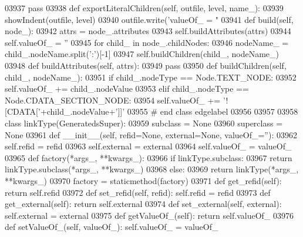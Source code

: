 \begin{DoxyCode}
{{{{{{{{{{{{{{{{{{{{{{{{{{{{{{{{{{{{{{{{{{{{{{{{{{{{{{{{{{{{{{{{{{{{{{{{{{{{{{{{{{{{{{{{{{{{{{{{{{{{{{{{{{{{{{{{{{{{{{{{{{{{{{{{{{{{{{{{{{{{{{{{{{{{{{{{{{{{{{{{{{{{{{{{{{{{{{{{{{{{{{{{{{{{{{{{{{{{{{{{{{{{{{{{{{{{{{{{{{{{{{{{{{{{{{{{{{{{{{{{{{{{{{{{{{{{{{{03937         \textcolor{keywordflow}{pass}
03938     \textcolor{keyword}{def }exportLiteralChildren(self, outfile, level, name\_):
03939         showIndent(outfile, level)
03940         outfile.write(\textcolor{stringliteral}{'valueOf\_ = "%
03941     \textcolor{keyword}{def }build(self, node\_):
03942         attrs = node\_.attributes
03943         self.buildAttributes(attrs)
03944         self.valueOf_ = \textcolor{stringliteral}{''}
03945         \textcolor{keywordflow}{for} child\_ \textcolor{keywordflow}{in} node\_.childNodes:
03946             nodeName\_ = child\_.nodeName.split(\textcolor{stringliteral}{':'})[-1]
03947             self.buildChildren(child\_, nodeName\_)
03948     \textcolor{keyword}{def }buildAttributes(self, attrs):
03949         \textcolor{keywordflow}{pass}
03950     \textcolor{keyword}{def }buildChildren(self, child\_, nodeName\_):
03951         \textcolor{keywordflow}{if} child\_.nodeType == Node.TEXT\_NODE:
03952             self.valueOf\_ += child\_.nodeValue
03953         \textcolor{keywordflow}{elif} child\_.nodeType == Node.CDATA\_SECTION\_NODE:
03954             self.valueOf\_ += \textcolor{stringliteral}{'![CDATA['}+child\_.nodeValue+\textcolor{stringliteral}{']]'}
03955 \textcolor{comment}{# end class edgelabel}
03956 
03957 
03958 \textcolor{keyword}{class }linkType(GeneratedsSuper):
03959     subclass = \textcolor{keywordtype}{None}
03960     superclass = \textcolor{keywordtype}{None}
03961     \textcolor{keyword}{def }__init__(self, refid=None, external=None, valueOf\_=''):
03962         self.refid = refid
03963         self.external = external
03964         self.valueOf_ = valueOf\_
03965     \textcolor{keyword}{def }factory(*args\_, **kwargs\_):
03966         \textcolor{keywordflow}{if} linkType.subclass:
03967             \textcolor{keywordflow}{return} linkType.subclass(*args\_, **kwargs\_)
03968         \textcolor{keywordflow}{else}:
03969             \textcolor{keywordflow}{return} linkType(*args\_, **kwargs\_)
03970     factory = staticmethod(factory)
03971     \textcolor{keyword}{def }get_refid(self): \textcolor{keywordflow}{return} self.refid
03972     \textcolor{keyword}{def }set_refid(self, refid): self.refid = refid
03973     \textcolor{keyword}{def }get_external(self): \textcolor{keywordflow}{return} self.external
03974     \textcolor{keyword}{def }set_external(self, external): self.external = external
03975     \textcolor{keyword}{def }getValueOf_(self): \textcolor{keywordflow}{return} self.valueOf\_
03976     \textcolor{keyword}{def }setValueOf_(self, valueOf\_): self.valueOf\_ = valueOf\_
}}}}}}}}}}}}}}}}}}}}}}}}}}}}}}}}}}}}}}}}}}}}}}}}}}}}}}}}}}}}}}}}}}}}}}}}}}}}}}}}}}}}}}}}}}}}}}}}}}}}}}}}}}}}}}}}}}}}}}}}}}}}}}}}}}}}}}}}}}}}}}}}}}}}}}}}}}}}}}}}}}}}}}}}}}}}}}}}}}}}}}}}}}}}}}}}}}}}}}}}}}}}}}}}}}}}}}}}}}}}}}}}}}}}}}}}}}}}}}}}}}}}}}}}}}}}}}}}
\end{DoxyCode}
